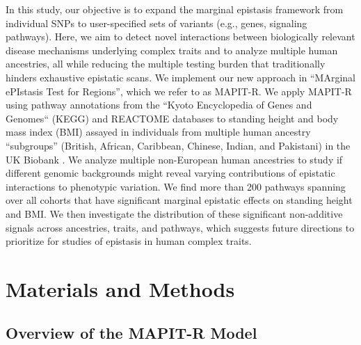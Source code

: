 \documentclass[10pt]{article}
\begin{document}
In this study, our objective is to expand the marginal epistasis framework from individual SNPs to user-specified sets of variants (e.g., genes, signaling pathways). Here, we aim to detect novel interactions between biologically relevant disease mechanisms underlying complex traits and to analyze multiple human ancestries, all while reducing the multiple testing burden that traditionally hinders exhaustive epistatic scans. We implement our new approach in ``MArginal ePIstasis Test for Regions'', which we refer to as MAPIT-R. We apply MAPIT-R using pathway annotations from the ``Kyoto Encyclopedia of Genes and Genomes`` (KEGG) and REACTOME databases \cite{Liberzon2011} to standing height and body mass index (BMI) assayed in individuals from multiple human ancestry ``subgroups'' (British, African, Caribbean, Chinese, Indian, and Pakistani) in the UK Biobank \cite{Sudlow2015}. We analyze multiple non-European human ancestries to study if different genomic backgrounds might reveal varying contributions of epistatic interactions to phenotypic variation. We find more than 200 pathways spanning over all cohorts that have significant marginal epistatic effects on standing height and BMI. We then investigate the distribution of these significant non-additive signals across ancestries, traits, and pathways, which suggests future directions to prioritize for studies of epistasis in human complex traits.


\section*{Materials and Methods} 

\subsection*{Overview of the MAPIT-R Model}
\end{document}
